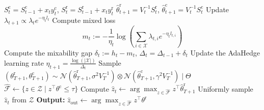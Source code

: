 \documentclass[accepted]{uai2025} %
\theoremstyle{plain}
\theoremstyle{definition}
\theoremstyle{remark}
\begin{document}
\begin{algorithm}
\begin{algorithmic}[1]
    \State $S^\mathrm{c}_t = S^\mathrm{c}_{t-1} + x_t y^\mathrm{c}_t$, $S^\mathrm{r}_t = S^\mathrm{r}_{t-1} + x_t y^\mathrm{r}_t$
    \State $\hat{\theta}^\mathrm{r}_{t+1} = V_t^{-1} S^\mathrm{r}_t$, $\hat{\theta}^\mathrm{c}_{t+1} = V_t^{-1} S^\mathrm{c}_t$
    \State Update $\lambda_{t+1} \propto \lambda_t e^{-\eta_t l_t}$
    \State Compute mixed loss $$m_t := -\frac{1}{\eta_t} \log\left( \sum_{i \in \mathcal{X}} \lambda_{t,i} e^{-\eta_t l_{t,i}} \right)$$
    \State Compute the mixability gap $\delta_t := h_t - m_t$, $\Delta_t = \Delta_{t-1} + \delta_t$
    \State Update the AdaHedge learning rate $\eta_{t+1} = \frac{\log(|\mathcal{X}|)}{\Delta_t}$
\EndFor
\State Sample $(\theta^{\mathrm{r}}_{T+1}, \theta^{\mathrm{c}}_{T+1}) \sim \mathcal{N}(\hat{\theta}^\mathrm{r}_{T+1}, \sigma^2 V_T^{-1}) \otimes \mathcal{N}(\hat{\theta}^\mathrm{c}_{T+1}, \gamma^2 V_T^{-1}) \mid \Theta$
\State $\hat{\mathcal{F}} \gets \{ z \in \mathcal{Z} \mid z^\top \theta^{\mathrm{c}} \le \tau \}$
    \State Compute $\hat{z}_t \gets \arg\max_{z \in \hat{\mathcal{F}}} z^\top \hat{\theta}^{\mathrm{r}}_{T+1}$
\Else
    \State Uniformly sample $\hat{z}_t$ from $\mathcal{Z}$
\EndIf
\State \textbf{Output:} $\hat{z}_{\mathrm{out}} \gets \arg\max_{z \in \hat{\mathcal{F}}} z^\top \theta^{\mathrm{r}}$
\end{algorithmic}
\caption{Best Linear Feasible arm identification with Posterior Sampling (BLFAIPS)}
 \label{alg:1}
\end{algorithm}
\end{document}
